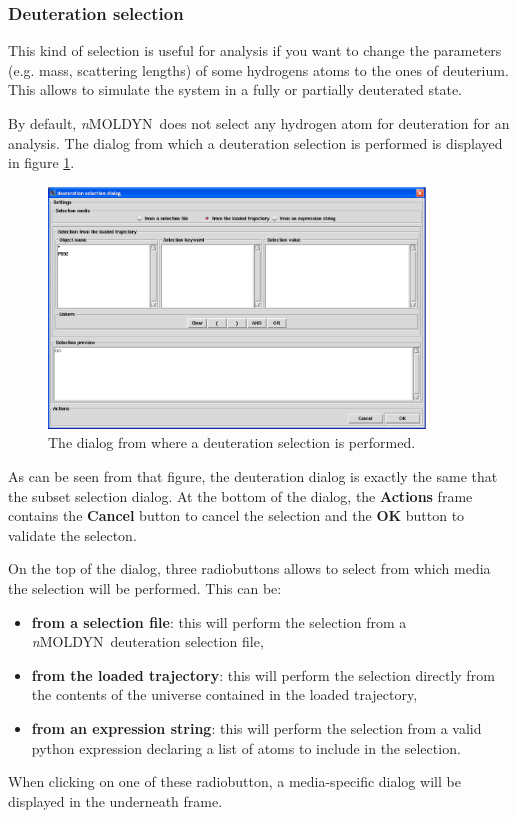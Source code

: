 \documentclass[a4paper,11pt]{report}
\newcommand{\NMOLDYN}{\textit{n}MOLDYN}
\begin{document}
\subsubsection{Deuteration selection}
\label{deuteration_selection}
This kind of selection is useful for analysis if you want to change the parameters (e.g. mass, scattering lengths) of some hydrogens 
atoms to the ones of deuterium. This allows to simulate the system in a fully or partially deuterated state.

By default, \NMOLDYN\ does not select any hydrogen atom for deuteration for an analysis. The dialog from which a deuteration 
selection is performed is displayed in figure \ref{fig:deuteration_selection}.
\begin{figure}[h!]
\begin{center}
\includegraphics[width=10cm]{Figures/deuteration_selection.eps}
\end{center}
\caption[The deuteration selection dialog]{The dialog from where a deuteration selection is performed.}
\label{fig:deuteration_selection}
\end{figure}   

As can be seen from that figure, the deuteration dialog is exactly the same that the subset selection dialog. At the bottom 
of the dialog, the \textbf{Actions} frame contains the \textbf{Cancel} button to cancel the selection and 
the \textbf{OK} button to validate the selecton.

On the top of the dialog, three radiobuttons allows to select from which media the selection will be performed. This can 
be:
\begin{itemize}
\item \textbf{from a selection file}: this will perform the selection from a \NMOLDYN\ deuteration selection file,
\item \textbf{from the loaded trajectory}: this will perform the selection directly from the contents of the universe contained 
in the loaded trajectory,
\item \textbf{from an expression string}: this will perform the selection from a valid python expression declaring a list 
of  atoms to include in the selection.
\end{itemize}
When clicking on one of these radiobutton, a media-specific dialog will be displayed in the underneath frame.
\end{document}
